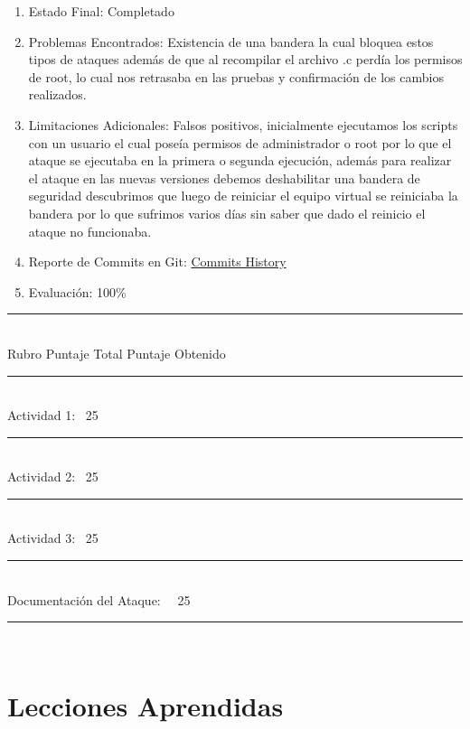 \documentclass{article}
\begin{document}
\begin{enumerate}
    \item Estado Final: Completado
    \item Problemas Encontrados: Existencia de una bandera la cual bloquea estos tipos de ataques además de que al recompilar el archivo .c perdía los permisos de root, lo cual nos retrasaba en las pruebas y confirmación de los cambios realizados.
    \item Limitaciones Adicionales: Falsos positivos, inicialmente ejecutamos los scripts con un usuario el cual poseía permisos de administrador o root por lo que el ataque se ejecutaba en la primera o segunda ejecución, además para realizar el ataque en las nuevas versiones debemos deshabilitar una bandera de seguridad descubrimos que luego de reiniciar el equipo virtual se reiniciaba la bandera por lo que sufrimos varios días sin saber que dado el reinicio el ataque no funcionaba.
    \item Reporte de Commits en Git: \href{https://github.com/varitomirandacr/SeguridadSO_RaceCondition/commits/main}{Commits History}
    \item Evaluación: 100\%
\end{enumerate}

    \noindent\rule{10cm}{0.4pt} \\
    Rubro   \qquad \qquad \qquad \qquad Puntaje Total    \qquad  Puntaje Obtenido \\
    \noindent\rule{10cm}{0.4pt} \\
    Actividad 1: \qquad \qquad \qquad \qquad \ 25 \qquad \qquad {}\\ 
    \noindent\rule{10cm}{0.1pt} \\
    Actividad 2: \qquad \qquad \qquad \qquad \ 25 \qquad \qquad {}\\ 
    \noindent\rule{10cm}{0.1pt} \\
    Actividad 3: \qquad \qquad \qquad \qquad \ 25 \qquad \qquad {}\\ 
    \noindent\rule{10cm}{0.1pt} \\
    Documentación del Ataque: \quad \ \ 25 \qquad \qquad {}\\ 
    \noindent\rule{10cm}{0.1pt} \\

\section*{Lecciones Aprendidas}
\end{document}
